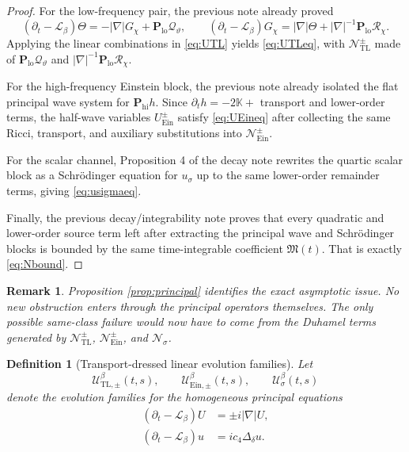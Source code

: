 \documentclass[11pt]{article}
\newcommand{\Ell}{\mathcal{L}}
\newtheorem{definition}{Definition}
\newtheorem{remark}{Remark}
\begin{document}
\begin{proof}
For the low-frequency pair, the previous note already proved
\[
(\partial_t-\Ell_\beta)\Theta
=
-|\nabla|G_\chi+\mathbf P_{\mathrm{lo}}\mathcal Q_\vartheta,
\qquad
(\partial_t-\Ell_\beta)G_\chi
=
|\nabla|\Theta+|\nabla|^{-1}\mathbf P_{\mathrm{lo}}\mathcal R_\chi.
\]
Applying the linear combinations in \eqref{eq:UTL} yields \eqref{eq:UTLeq}, with \(\mathcal N_{\mathrm{TL}}^\pm\) made of \(\mathbf P_{\mathrm{lo}}\mathcal Q_\vartheta\) and \(|\nabla|^{-1}\mathbf P_{\mathrm{lo}}\mathcal R_\chi\).

For the high-frequency Einstein block, the previous note already isolated the flat principal wave system for \(\mathbf P_{\mathrm{hi}}h\). Since \(\partial_t h=-2\mathbb K+\) transport and lower-order terms, the half-wave variables \(U_{\mathrm{Ein}}^\pm\) satisfy \eqref{eq:UEineq} after collecting the same Ricci, transport, and auxiliary substitutions into \(\mathcal N_{\mathrm{Ein}}^\pm\).

For the scalar channel, Proposition 4 of the decay note rewrites the quartic scalar block as a Schr\"odinger equation for \(u_\sigma\) up to the same lower-order remainder terms, giving \eqref{eq:usigmaeq}.

Finally, the previous decay/integrability note proves that every quadratic and lower-order source term left after extracting the principal wave and Schr\"odinger blocks is bounded by the same time-integrable coefficient \(\mathfrak M(t)\). That is exactly \eqref{eq:Nbound}.
\end{proof}

\begin{remark}
Proposition \ref{prop:principal} identifies the exact asymptotic issue. No new obstruction enters through the principal operators themselves. The only possible same-class failure would now have to come from the Duhamel terms generated by \(\mathcal N_{\mathrm{TL}}^\pm\), \(\mathcal N_{\mathrm{Ein}}^\pm\), and \(\mathcal N_\sigma\).
\end{remark}

\begin{definition}[Transport-dressed linear evolution families]
\label{def:families}
Let
\[
\mathcal U_{\mathrm{TL},\pm}^\beta(t,s),
\qquad
\mathcal U_{\mathrm{Ein},\pm}^\beta(t,s),
\qquad
\mathcal U_{\sigma}^\beta(t,s)
\]
denote the evolution families for the homogeneous principal equations
\begin{align}
(\partial_t-\Ell_\beta)U
&=
\pm i|\nabla|U,
\label{eq:wavefamily}
\\
(\partial_t-\Ell_\beta)u
&=
i c_4\Delta_\delta u.
\label{eq:schrfamily}
\end{align}
\end{definition}
\end{document}
